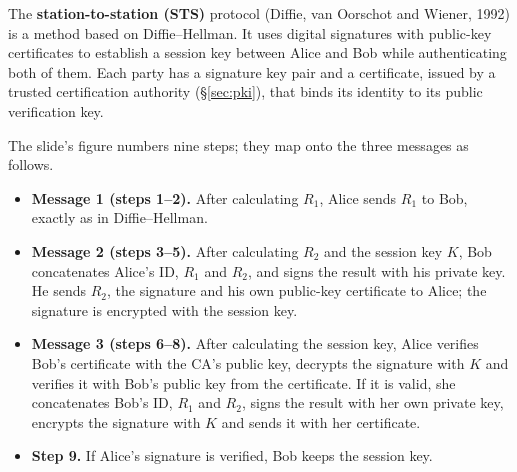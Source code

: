 The \textbf{station-to-station (STS)} protocol (Diffie, van Oorschot and Wiener, 1992) is a method based on Diffie--Hellman. It uses digital signatures with public-key certificates to establish a session key between Alice and Bob while authenticating both of them. Each party has a signature key pair and a certificate, issued by a trusted certification authority (\S\ref{sec:pki}), that binds its identity to its public verification key.
\begin{center}
\end{center}
The slide's figure numbers nine steps; they map onto the three messages as follows.
\begin{itemize}
  \item \textbf{Message 1 (steps 1--2).} After calculating $R_1$, Alice sends $R_1$ to Bob, exactly as in Diffie--Hellman.
  \item \textbf{Message 2 (steps 3--5).} After calculating $R_2$ and the session key $K$, Bob concatenates Alice's ID, $R_1$ and $R_2$, and signs the result with his private key. He sends $R_2$, the signature and his own public-key certificate to Alice; the signature is encrypted with the session key.
  \item \textbf{Message 3 (steps 6--8).} After calculating the session key, Alice verifies Bob's certificate with the CA's public key, decrypts the signature with $K$ and verifies it with Bob's public key from the certificate. If it is valid, she concatenates Bob's ID, $R_1$ and $R_2$, signs the result with her own private key, encrypts the signature with $K$ and sends it with her certificate.
  \item \textbf{Step 9.} If Alice's signature is verified, Bob keeps the session key.
\end{itemize}


